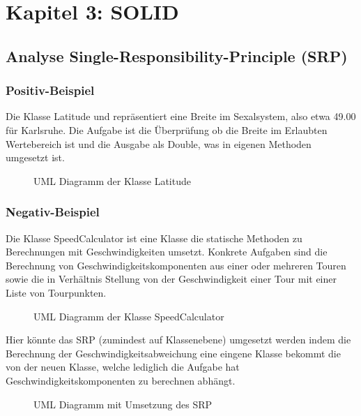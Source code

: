\section{Kapitel 3: SOLID}

\subsection{Analyse Single-Responsibility-Principle (SRP)}

\subsubsection{Positiv-Beispiel}
 
Die Klasse Latitude und repräsentiert eine Breite im Sexalsystem, also etwa 49.00 für Karlsruhe. Die Aufgabe ist die Überprüfung ob die Breite im Erlaubten Wertebereich ist und die Ausgabe als Double, was in eigenen Methoden umgesetzt ist.

\begin{figure}[h]
  \centering
  
  \caption{UML Diagramm der Klasse Latitude}
\end{figure}

\subsubsection{Negativ-Beispiel}

Die Klasse SpeedCalculator ist eine Klasse die statische Methoden zu Berechnungen mit Geschwindigkeiten umsetzt. Konkrete Aufgaben sind die Berechnung von Geschwindigkeitskomponenten aus einer oder mehreren Touren sowie die in Verhältnis Stellung von der Geschwindigkeit einer Tour mit einer Liste von Tourpunkten.

\begin{figure}[h]
  \centering
  
  \caption{UML Diagramm der Klasse SpeedCalculator}
\end{figure}

Hier könnte das SRP (zumindest auf Klassenebene) umgesetzt werden indem die Berechnung der Geschwindigkeitsabweichung eine eingene Klasse bekommt die von der neuen Klasse, welche lediglich die Aufgabe hat Geschwindigkeitskomponenten zu berechnen abhängt.

\begin{figure}[h]
  \centering
  
  \caption{UML Diagramm mit Umsetzung des SRP}
\end{figure}

